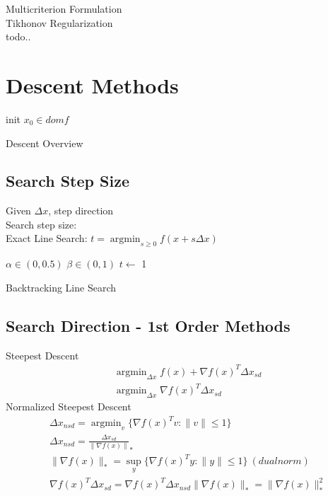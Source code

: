 \documentclass[8pt]{extarticle}
\DeclareMathOperator*{\argmin}{argmin}
\newcommand{\norm}[1]{\|#1\|}
\newcommand{\set}[1]{\{#1\}}
\begin{document}
\begin{multicols*}{2}
  Multicriterion Formulation\\

  Tikhonov Regularization\\
  todo..
  
  \vfill\null
  
  \pagebreak

  \section{Descent Methods}

  \begin{algorithm}[H]
    init $x_0 \in dom f$\;
    \caption{Descent Overview\label{Descent}}
  \end{algorithm}
  
  \subsection{Search Step Size}
  Given $\Delta x$, step direction\\
  Search step size:\\
  Exact Line Search: $t = \argmin_{s\geq 0} f(x+s \Delta x)$\\

  \begin{algorithm}[H]
    $\alpha \in (0,0.5)$\;
    $\beta \in (0,1)$\;
    $t \leftarrow$ 1\;
    \caption{Backtracking Line Search\label{LS_BT}}
  \end{algorithm}

  \vfill\null
  \columnbreak
  
  \subsection{Search Direction - 1st Order Methods}
  Steepest Descent
  \begin{align*}
    &\argmin_{\Delta x} f(x) + \nabla f(x)^T \Delta x_{sd}\\
    &\argmin_{\Delta x} \nabla f(x)^T \Delta x_{sd}
  \end{align*}
  Normalized Steepest Descent
  \begin{align*}
    &\Delta x_{nsd} = \argmin_{v} \set{ \nabla f(x)^T v : \norm{v} \leq 1 }\\
    &\Delta x_{nsd} = \frac{\Delta x_{sd}}{\norm{\nabla f(x)}}_*\\
    &\norm{\nabla f(x)}_* = \sup_y \{\nabla f(x)^T y: \|y\| \leq 1 \}\ (dual norm)\\
    &\nabla f(x)^T \Delta x_{sd} = \nabla f(x)^T \Delta x_{nsd} \norm{\nabla f(x)}_* = \norm{\nabla f(x)}_*^2
  \end{align*}


\end{multicols*}
\end{document}
